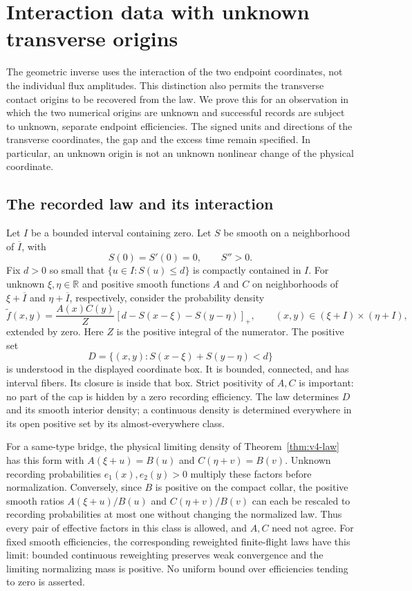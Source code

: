 \section{Interaction data with unknown transverse origins}
\label{sec:v51-interaction}

The geometric inverse uses the interaction of the two endpoint coordinates,
not the individual flux amplitudes.  This distinction also permits the
transverse contact origins to be recovered from the law.  We prove this for
an observation in which the two numerical origins are unknown and successful
records are subject to unknown, separate endpoint efficiencies.  The signed
units and directions of the transverse coordinates, the gap and the excess
time remain specified.  In particular, an unknown origin is not an unknown
nonlinear change of the physical coordinate.

\subsection{The recorded law and its interaction}

Let $I$ be a bounded interval containing zero.  Let $S$ be smooth on a
neighborhood of $\overline I$, with
\[
 S(0)=S'(0)=0,\qquad S''>0.
\]
Fix $d>0$ so small that $\{u\in I:S(u)\le d\}$ is compactly contained
in $I$.  For unknown $\xi,\eta\in\mathbb R$ and positive smooth
functions $A$ and $C$ on neighborhoods of $\xi+\overline I$ and
$\eta+\overline I$, respectively, consider the probability density
\begin{equation}\label{eq:v51-recorded-law}
 \widetilde f(x,y)=\frac{A(x)C(y)}{Z}
       [d-S(x-\xi)-S(y-\eta)]_+,
 \qquad (x,y)\in(\xi+I)\times(\eta+I),
\end{equation}
extended by zero.  Here $Z$ is the positive integral of the numerator.
The positive set
\begin{equation}\label{eq:v51-positive-set}
 D=\{(x,y):S(x-\xi)+S(y-\eta)<d\}
\end{equation}
is understood in the displayed coordinate box.  It is bounded, connected,
and has interval fibers.  Its closure is inside that box.  Strict positivity
of $A,C$ is important: no part of the cap is hidden by a zero recording
efficiency.  The law determines $D$ and its smooth interior density; a
continuous density is determined everywhere in its open positive set by
its almost-everywhere class.

For a same-type bridge, the physical limiting density of
Theorem~\ref{thm:v4-law} has this form with
$A(\xi+u)=B(u)$ and $C(\eta+v)=B(v)$.  Unknown recording probabilities
$e_1(x),e_2(y)>0$ multiply these factors before normalization.  Conversely,
since $B$ is positive on the compact collar, the positive smooth ratios
$A(\xi+u)/B(u)$ and $C(\eta+v)/B(v)$ can each be rescaled to recording
probabilities at most one without changing the normalized law.  Thus every
pair of effective factors in this class is allowed, and $A,C$ need not agree.
For fixed smooth efficiencies, the corresponding reweighted finite-flight
laws have this limit: bounded continuous reweighting preserves weak
convergence and the limiting normalizing mass is positive.  No uniform
bound over efficiencies tending to zero is asserted.

